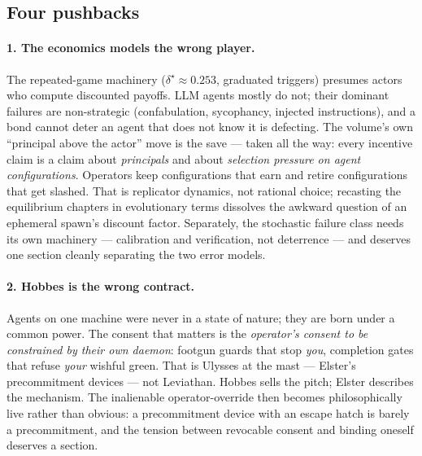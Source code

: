\documentclass[11pt,a4paper]{article}
\theoremstyle{definition}
\theoremstyle{remark}
\begin{document}
\subsection{Four pushbacks}
\paragraph{1. The economics models the wrong player.} The repeated-game machinery ($\delta^\star \approx 0.253$, graduated triggers) presumes actors who compute discounted payoffs. LLM agents mostly do not; their dominant failures are non-strategic (confabulation, sycophancy, injected instructions), and a bond cannot deter an agent that does not know it is defecting. The volume's own ``principal above the actor'' move is the save --- taken all the way: every incentive claim is a claim about \emph{principals} and about \emph{selection pressure on agent configurations}. Operators keep configurations that earn and retire configurations that get slashed. That is replicator dynamics, not rational choice; recasting the equilibrium chapters in evolutionary terms dissolves the awkward question of an ephemeral spawn's discount factor. Separately, the stochastic failure class needs its own machinery --- calibration and verification, not deterrence --- and deserves one section cleanly separating the two error models.

\paragraph{2. Hobbes is the wrong contract.} Agents on one machine were never in a state of nature; they are born under a common power. The consent that matters is the \emph{operator's consent to be constrained by their own daemon}: footgun guards that stop \emph{you}, completion gates that refuse \emph{your} wishful green. That is Ulysses at the mast --- Elster's precommitment devices --- not Leviathan. Hobbes sells the pitch; Elster describes the mechanism. The inalienable operator-override then becomes philosophically live rather than obvious: a precommitment device with an escape hatch is barely a precommitment, and the tension between revocable consent and binding oneself deserves a section.
\end{document}
